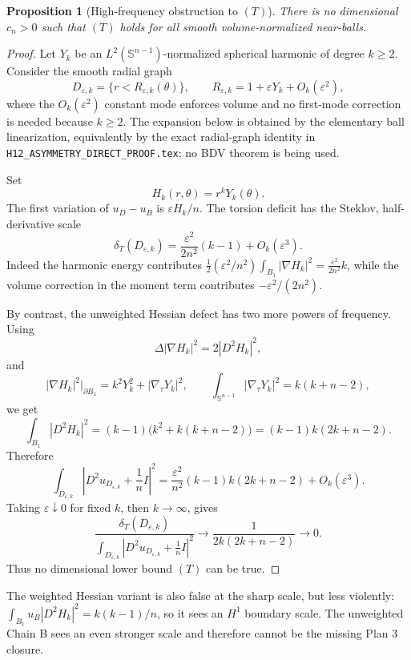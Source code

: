 \documentclass[11pt]{article}
\newtheorem{proposition}[theorem]{Proposition}
\newcommand{\Sph}{\mathbb S}
\newcommand{\eps}{\varepsilon}
\begin{document}
\begin{proposition}[High-frequency obstruction to \((T)\)]
There is no dimensional \(c_n>0\) such that \((T)\) holds for all smooth
volume-normalized near-balls.
\end{proposition}

\begin{proof}
Let \(Y_k\) be an \(L^2(\Sph^{n-1})\)-normalized spherical harmonic of degree
\(k\ge2\).  Consider the smooth radial graph
\[
   D_{\eps,k}=\{r< R_{\eps,k}(\theta)\},\qquad
   R_{\eps,k}=1+\eps Y_k+O_k(\eps^2),
\]
where the \(O_k(\eps^2)\) constant mode enforces volume and no first-mode
correction is needed because \(k\ge2\).  The expansion below is obtained by
the elementary ball linearization, equivalently by the exact radial-graph
identity in \texttt{H12\_ASYMMETRY\_DIRECT\_PROOF.tex}; no BDV theorem is
being used.

Set
\[
   H_k(r,\theta)=r^kY_k(\theta).
\]
The first variation of \(u_D-u_B\) is \(\eps H_k/n\).  The torsion deficit
has the Steklov, half-derivative scale
\[
   \delta_T(D_{\eps,k})
      = \frac{\eps^2}{2n^2}(k-1)+O_k(\eps^3).
   \tag{2.1}
\]
Indeed the harmonic energy contributes
\(\frac12(\eps^2/n^2)\int_{B_1}|\nabla H_k|^2
=\frac{\eps^2}{2n^2}k\), while the volume correction in the moment term
contributes \(-\eps^2/(2n^2)\).

By contrast, the unweighted Hessian defect has two more powers of frequency.
Using
\[
   \Delta |\nabla H_k|^2=2|D^2H_k|^2,
\]
and
\[
   |\nabla H_k|^2\big|_{\partial B_1}
      = k^2Y_k^2+|\nabla_\tau Y_k|^2,\qquad
   \int_{\Sph^{n-1}}|\nabla_\tau Y_k|^2
      = k(k+n-2),
\]
we get
\[
   \int_{B_1}|D^2H_k|^2
       = (k-1)\bigl(k^2+k(k+n-2)\bigr)
       = (k-1)k(2k+n-2).
   \tag{2.2}
\]
Therefore
\[
   \int_{D_{\eps,k}}\left|D^2u_{D_{\eps,k}}+\frac1nI\right|^2
      = \frac{\eps^2}{n^2}(k-1)k(2k+n-2)+O_k(\eps^3).
   \tag{2.3}
\]
Taking \(\eps\downarrow0\) for fixed \(k\), then \(k\to\infty\), gives
\[
   \frac{\delta_T(D_{\eps,k})}
        {\int_{D_{\eps,k}}|D^2u_{D_{\eps,k}}+\frac1nI|^2}
      \longrightarrow
      \frac{1}{2k(2k+n-2)}\longrightarrow0.
\]
Thus no dimensional lower bound \((T)\) can be true.
\end{proof}

The weighted Hessian variant is also false at the sharp scale, but less
violently: \(\int_{B_1}u_B|D^2H_k|^2=k(k-1)/n\), so it sees an \(H^1\)
boundary scale.  The unweighted Chain B sees an even stronger scale and
therefore cannot be the missing Plan 3 closure.
\end{document}
